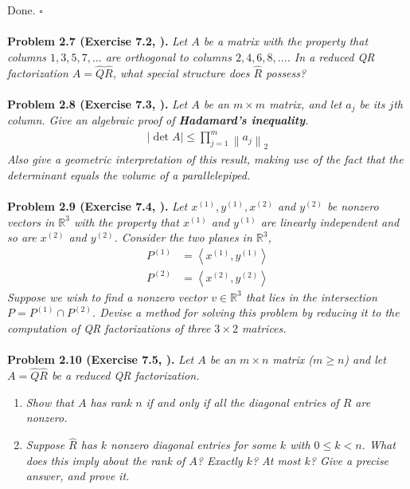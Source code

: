 \documentclass[a4paper,oneside]{book}
\numberwithin{equation}{chapter}
\begin{document}
Done. \hfill $\square$\\
\\
\textbf{Problem 2.7 (Exercise 7.2, \cite{1}).} \textit{Let $A$ be a matrix with the property that columns $1,3,5,7,\ldots$ are orthogonal to columns $2,4,6,8,\ldots$. In a reduced QR factorization $A=\hat Q \hat R$, what special structure does $\hat R$ possess?}\\
\\
\textbf{Problem 2.8 (Exercise 7.3, \cite{1}).} \textit{Let $A$ be an $m\times m$ matrix, and let $a_j$ be its $j$th column. Give an algebraic proof of \textbf{Hadamard's inequality}.}
\begin{align}
\left| {\det A} \right| \le \prod\limits_{j = 1}^m {{{\left\| {{a_j}} \right\|}_2}} 
\end{align}
\textit{Also give a geometric interpretation of this result, making use of the fact that the determinant equals the volume of a parallelepiped.}\\
\\
\textbf{Problem 2.9 (Exercise 7.4, \cite{1}).} \textit{Let ${x^{\left( 1 \right)}},{y^{\left( 1 \right)}},{x^{\left( 2 \right)}}$ and ${y^{\left( 2 \right)}}$ be nonzero vectors in $\mathbb{R}^3$ with the property that $x^{\left(1\right)}$ and $y^{\left(1\right)}$ are linearly independent and so are $x^{\left(2\right)}$ and $y^{\left(2\right)}$. Consider the two planes in $\mathbb{R}^3$,}
\begin{align}
{P^{\left( 1 \right)}} &= \left\langle {{x^{\left( 1 \right)}},{y^{\left( 1 \right)}}} \right\rangle \\
{P^{\left( 2 \right)}} &= \left\langle {{x^{\left( 2 \right)}},{y^{\left( 2 \right)}}} \right\rangle 
\end{align}
\textit{Suppose we wish to find a nonzero vector $v\in \mathbb{R}^3$ that lies in the intersection $P = {P^{\left( 1 \right)}} \cap {P^{\left( 2 \right)}}$. Devise a method for solving this problem by reducing it to the computation of QR factorizations of three $3\times 2$ matrices.}\\
\\
\textbf{Problem 2.10 (Exercise 7.5, \cite{1}).} \textit{Let $A$ be an $m\times n$ matrix ($m \ge n$) and let $A =\hat Q \hat R$ be a reduced QR factorization.}
\begin{enumerate}
\item \textit{Show that $A$ has rank $n$ if and only if all the diagonal entries of $\hat R$ are nonzero.}
\item \textit{Suppose $\hat R$ has $k$ nonzero diagonal entries for some $k$ with $0 \le k < n$. What does this imply about the rank of $A$? Exactly $k$? At most $k$? Give a precise answer, and prove it.}
\end{enumerate}
\end{document}
